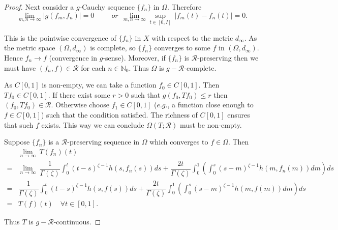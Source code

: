 \documentclass[10pt, reqno]{amsart}
\theoremstyle{definition}
\theoremstyle{remark}
\numberwithin{equation}{section}
\begin{document}
\begin{proof}
Next consider a $g$-Cauchy sequence $ \{ f_n\} $ in $ \Omega $. Therefore
$$  \underset{m,n \to \infty }{\lim} | g ( f_m, f_n ) | = 0  ~\qquad ~ or ~~
	  \underset{m,n \to \infty }{\lim} \underset{t \in [0, I] }{\sup} ~ |  f_m ( t ) - f_n ( t ) | = 0.  $$
      
This is the pointwise convergence of $ \{ f_n\} $ in $X$ with respect to the   metric $ d_\infty$. As the metric space $  ( \Omega,   d_\infty ) $ is complete, so $ \{ f_n\} $ converges to some $ f$ in $ ( \Omega,   d_\infty ) $. Hence $  f_n \to f $ (convergence in $ g $-sense). Moreover, if $ \{ f_n\} $ is $ \mathcal{R}$-preserving then we must have $( f_n, f)\in\mathcal{R}$ for each $n\in\mathbb{N}_0$. Thus $ \Omega $ is  $g-\mathcal{R}$-complete. 

As $ C [ 0, 1 ] $ is non-empty, we can take   a function $ f_0 \in C [ 0, 1 ] $. Then   $ T f _0 \in C [ 0, 1 ] $. If there exist some $ r > 0 $ such that $ g ( f_0, T f _0 ) \leq r $ then $ ( f_0, T f _0 ) \in \mathcal{R} $. Otherwise choose $ f_1 \in C [ 0, 1 ] $ ($e.g.$, a function close enough to $f \in  C [ 0, 1 ] $) such that the condition satisfied. The richness of $  C [ 0, 1 ] $ ensures that such $f$ exists.  This way we can conclude $ \Omega (T; \mathcal{R} ) $ must be non-empty.    

Suppose $ \{ f_n\} $ is a $ \mathcal{R} $-preserving sequence in $ \Omega$ which converges to $ f \in \Omega $. Then 
\begin{align*} 
	& \underset{ n \to \infty }{\lim} ~ T ( f_n ) ( t ) \\
    = & \underset{ n \to \infty }{\lim} ~ \dfrac{1}{\Gamma ( \zeta )} \int_{0}^{t} ( t- s)^{ \zeta - 1} h (s, f_n (s)) ds +   \dfrac{2 t }{\Gamma ( \zeta )} \int_{0}^{1}  \left( \int_{0}^{s} ( s - m)^{ \zeta - 1} h  ( m, f_n ( m ) ) dm    \right) ds \\
	 = & \dfrac{1}{\Gamma ( \zeta )} \int_{0}^{t} ( t- s)^{ \zeta - 1} h (s, f (s)) ds +   \dfrac{2 t }{\Gamma ( \zeta )} \int_{0}^{1}  \left( \int_{0}^{s} ( s - m)^{ \zeta - 1} h  ( m, f ( m ) ) dm    \right) ds \\
     = & T ( f ) ( t )  \quad \forall t \in [ 0, 1 ]. 
\end{align*} 

Thus $T$ is $g-\mathcal{R}$-continuous.


\end{proof}
\end{document}
